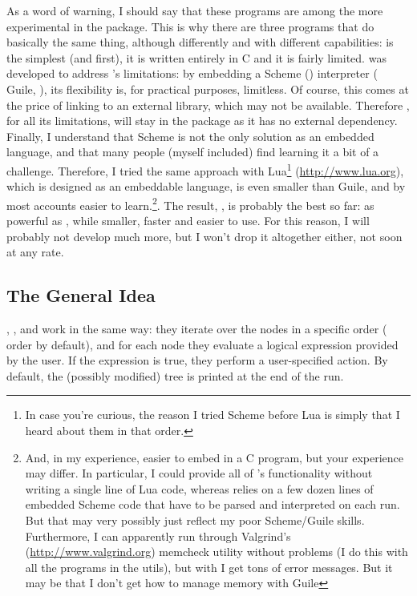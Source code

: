 As a word of warning, I should say that these programs are among the more
experimental in the \nutils{} package. This is why there are three programs
that do basically the same thing, although differently and with different
capabilities: \ed{} is the simplest (and first), it is written entirely in C
and it is fairly limited. \sched{} was developed to address \ed{}'s
limitations: by embedding a Scheme () interpreter (\gnu{}
Guile, ), its flexibility is, for practical purposes,
limitless. Of course, this comes at the price of linking to an external
library, which may not be available. Therefore \ed{}, for all its limitations,
will stay in the package as it has no external dependency. Finally, I
understand that Scheme is not the only solution as an embedded language, and
that many people (myself included) find learning it a bit of a challenge.
Therefore, I tried the same approach with Lua\footnote{In case you're curious,
the reason I tried Scheme before Lua is simply that I heard about them in that
order.} (\url{http://www.lua.org}), which is designed as an embeddable
language, is even smaller than Guile, and by most accounts easier to
learn.\footnote{And, in my experience, easier to embed in a C program, but your
experience may differ. In particular, I could provide all of \luaed's
functionality without writing a single line of Lua code, whereas \sched{}
relies on a few dozen lines of embedded Scheme code that have to be parsed and
interpreted on each run. But that may very possibly just reflect my poor
Scheme/Guile skills. Furthermore, I can apparently run \luaed{} through
Valgrind's (\url{http://www.valgrind.org}) memcheck utility without problems (I
do this with all the programs in the utils), but with \sched{} I get tons of
error messages. But it may be that I don't get how to manage memory with
Guile}. The result, \luaed, is probably the best so far: as powerful as \sched,
while smaller, faster and easier to use. For this reason, I will probably not
develop \sched{} much more, but I won't drop it altogether either, not soon at
any rate. 

\subsection{The General Idea}

\ed, \sched, and \luaed{} work in the same way: they iterate over the nodes in a
specific order (\nw{} order by default), and for each node they evaluate a
logical expression provided by the user. If the expression is true, they perform
a user-specified action.  By default, the (possibly modified) tree is printed at
the end of the run.  

